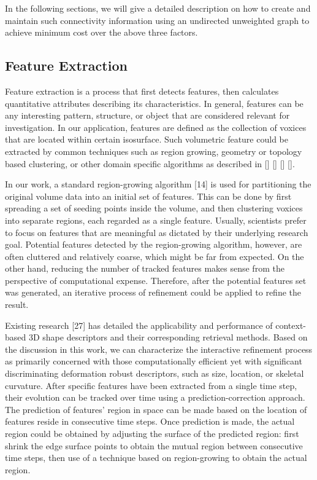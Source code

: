 \documentclass[10pt, conference, compsocconf]{IEEEtran}
\begin{document}
In the following sections, we will give a detailed description on how to create and maintain such connectivity information using an undirected unweighted graph to achieve minimum cost over the above three factors.

\subsection{Feature Extraction}
Feature extraction is a process that first detects features, then calculates quantitative attributes describing its characteristics. In general, features can be any interesting pattern, structure, or object that are considered relevant for investigation. In our application, features are defined as the collection of voxices that are located within certain isosurface. Such volumetric feature could be extracted by common techniques such as region growing, geometry or topology based clustering, or other domain specific algorithms as described in [] [] [] []. 

In our work, a standard region-growing algorithm [14] is used for partitioning the original volume data into an initial set of features. This can be done by first spreading a set of seeding points inside the volume, and then clustering voxices into separate regions, each regarded as a single feature. Usually, scientists prefer to focus on features that are meaningful as dictated by their underlying research goal. Potential features detected by the region-growing algorithm, however, are often cluttered and relatively coarse, which might be far from expected. On the other hand, reducing the number of tracked features makes sense from the perspective of computational expense. Therefore, after the potential features set was generated, an iterative process of refinement could be applied to refine the result. 

Existing research [27] has detailed the applicability and performance of context-based 3D shape descriptors and their corresponding retrieval methods. Based on the discussion in this work, we can characterize the interactive refinement process as primarily concerned with those computationally efficient yet with significant discriminating deformation robust descriptors, such as size, location, or skeletal curvature. After specific features have been extracted from a single time step, their evolution can be tracked over time using a prediction-correction approach. The prediction of features' region in space can be made based on the location of features reside in consecutive time steps. Once prediction is made, the actual region could be obtained by adjusting the surface of the predicted region: first shrink the edge surface points to obtain the mutual region between consecutive time steps, then use of a technique based on region-growing to obtain the actual region.
\end{document}
